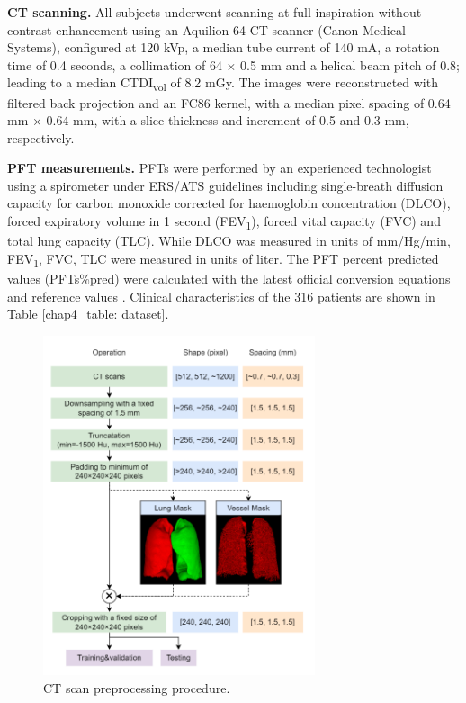 \textbf{CT scanning.} All subjects underwent scanning at full inspiration without contrast enhancement using an Aquilion 64 CT scanner (Canon Medical Systems), configured at 120 kVp, a median tube current of 140 mA, a rotation time of 0.4 seconds, a collimation of 64 × 0.5 mm and a helical beam pitch of 0.8; leading to a median CTDI\textsubscript{vol} of 8.2 mGy. The images were reconstructed with filtered back projection and an FC86 kernel, with a median pixel spacing of 0.64 mm × 0.64 mm, with a slice thickness and increment of 0.5 and 0.3 mm, respectively.

\textbf{PFT measurements.} PFTs were performed by an experienced technologist using a spirometer under ERS/ATS guidelines \cite{Miller2005, Graham2017} including single-breath diffusion capacity for carbon monoxide corrected for haemoglobin concentration (DLCO), forced expiratory volume in 1 second (FEV\textsubscript{1}), forced vital capacity (FVC) and total lung capacity (TLC). While DLCO was measured in units of mm/Hg/min, FEV\textsubscript{1}, FVC, TLC were measured in units of liter. The PFT percent predicted values (PFTs\%pred) were calculated with the latest official conversion equations and reference values \cite{Hall2021, Stanojevic2017, Quanjer2012}. Clinical characteristics of the 316 patients are shown in Table \ref{chap4_table: dataset}.

\begin{figure}[tb]
    \centering
    \includegraphics[width=8cm]{preprocessing.png}
    \caption{CT scan preprocessing procedure.}
    \label{fig:chap4_preprocessing}
\end{figure}

